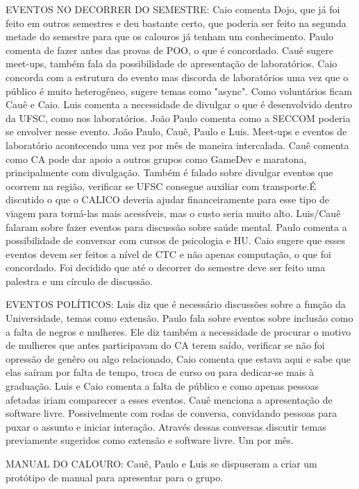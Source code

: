 \documentclass{ata-calico}
\begin{document}
EVENTOS NO DECORRER DO SEMESTRE:
Caio comenta Dojo, que já foi feito em outros semestres e deu bastante certo, que poderia ser feito na segunda metade do semestre para que os calouros já tenham um conhecimento. Paulo comenta de fazer antes das provas de  POO, o que é concordado.
Cauê sugere meet-ups, também fala da possibilidade de apresentação de laboratórios. Caio concorda com a estrutura do evento mas discorda de laboratórios uma vez que o público é muito heterogêneo, sugere temas como "async". Como voluntários ficam Cauê e Caio.
Luis comenta a necessidade de divulgar o que é desenvolvido dentro da UFSC, como nos laboratórios. João Paulo comenta como a SECCOM poderia se envolver nesse evento. João Paulo, Cauê, Paulo e Luis.
Meet-ups e eventos de laboratório acontecendo uma vez por mês de maneira intercalada.
Cauê comenta como CA pode dar apoio a outros grupos como GameDev e maratona, principalmente com divulgação.
Também é falado sobre divulgar eventos que ocorrem na região, verificar se UFSC consegue auxiliar com transporte.É discutido o que o CALICO deveria ajudar financeiramente para esse tipo de viagem para torná-las mais acessíveis, mas o custo seria muito alto.
Luis/Cauê falaram sobre fazer eventos para discussão sobre saúde mental. Paulo comenta a possibilidade de conversar com cursos de psicologia e HU. Caio sugere que esses eventos devem ser feitos a nível de CTC e não apenas computação, o que foi concordado. Foi decidido que até o decorrer do semestre deve ser feito uma palestra e um círculo de discussão.\newline

EVENTOS POLÍTICOS:
Luis diz que é necessário discussões sobre a função da Universidade, temas como extensão.
Paulo fala sobre eventos sobre inclusão como a falta de negros e mulheres. Ele diz também a necessidade de procurar o motivo de mulheres que antes participavam do CA terem saído, verificar se não foi opressão de genêro ou algo relacionado, Caio comenta que estava aqui e sabe que elas saíram por falta de tempo, troca de curso ou para dedicar-se mais à graduação. Luis e Caio comenta a falta de público e como apenas pessoas afetadas iriam comparecer a esses eventos.
Cauê menciona a apresentação de software livre.
Possivelmente com rodas de conversa, convidando pessoas para puxar o assunto e iniciar interação. Através dessas conversas discutir temas previamente sugeridos como extensão e software livre. Um por mês.\newline

MANUAL DO CALOURO:
Cauê, Paulo e Luis se dispuseram a criar um protótipo de manual para apresentar para o grupo.\newline
\end{document}
